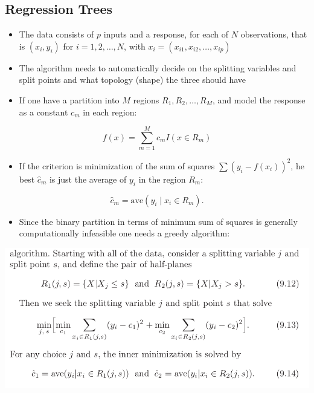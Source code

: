 \documentclass[11pt]{article}
\begin{document}
\subsection{Regression Trees}
\label{sec:orgba60c1d}
\begin{itemize}
\item The data consists of \(p\) inputs and a response, for each of \(N\) observations, that is \((x_i,y_i)\) for \(i=1,2,\dots,N\), with \(x_i=(x_{i1}, x_{i2}, \dots, x_{ip})\)
\item The algorithm needs to automatically decide on the splitting variables and split points and what topology (shape) the three should have
\item If one have a partition into \(M\) regions \(R_1,R_2,\dots,R_M\), and model the response as a constant \(c_m\) in each region:
\end{itemize}
\begin{equation}
  f(x) = \sum_{m=1}^Mc_mI(x \in R_m)
\end{equation}
\begin{itemize}
\item If the criterion is minimization of the sum of squares \(\sum(y_i-f(x_i))^2\), he best \(\hat c_m\) is just the average of \(y_i\) in the region \(R_m\):
\end{itemize}
\begin{equation}
  \hat c_m = \text{ave}(y_i \mid x_i \in R_m ).
\end{equation}
\begin{itemize}
\item Since the binary partition in terms of minimum sum of squares is generally computationally infeasible one needs a greedy algorithm:
\end{itemize}
\begin{center}
\includegraphics[width=.9\linewidth]{Tree-Based Methods/screenshot_2018-10-08_16-15-20.png}
\end{center}
\end{document}
